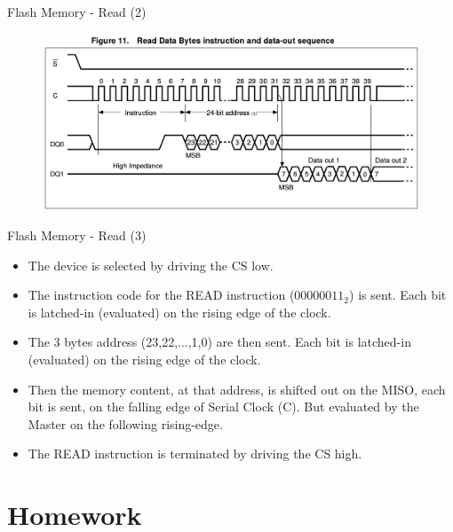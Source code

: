 \documentclass{beamer}
\begin{document}
    \begin{frame}{Flash Memory - Read (2)}
    	\begin{figure}[!tbh]
    		\centering
    		\includegraphics*[width=1\textwidth]{images/read}
    	\end{figure}       	
    \end{frame}
 
    \begin{frame} {Flash Memory - Read (3)}
    	\begin{itemize}
    		\item The device is selected by driving the CS low.
    		\item The instruction code for the READ instruction ($00000011_2$) is sent. Each bit is latched-in (evaluated) on the rising edge of the clock.
	    	\item The 3 bytes address (23,22,...,1,0) are then sent. Each bit is latched-in (evaluated) on the rising edge of the clock.
	    	\item Then the memory content, at that address, is shifted out on the MISO, each bit is sent, on the falling edge of Serial Clock (C). {\large But} evaluated by the Master on the following rising-edge.
	    	\item The READ instruction is terminated by driving the CS high.    	\end{itemize}
    \end{frame}
    
   \section{Homework}
  
\end{document}
